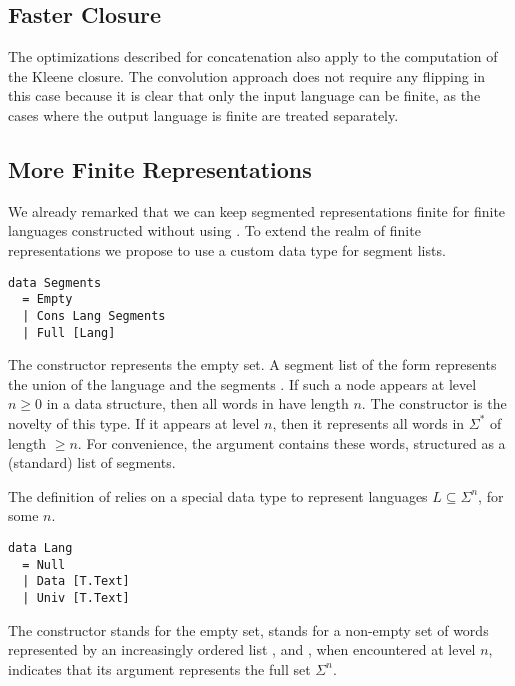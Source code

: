 
\subsection{Faster Closure}
\label{sec:faster-closure}

The optimizations described for concatenation also apply to the
computation of the Kleene closure. The convolution approach does not
require any flipping in this case because it is clear that only the input language
can be finite, as the cases where the output language is finite are
treated separately.  

\subsection{More Finite Representations}
\label{sec:more-finite-repr}

We already remarked that we can keep segmented representations finite
for finite languages constructed without using .  To
extend the realm of finite representations we propose to use a custom
data type  for segment lists.
\begin{lstlisting}
data Segments
  = Empty
  | Cons Lang Segments
  | Full [Lang]
\end{lstlisting}
The constructor  represents the empty set. A segment list
of the form  represents the union of the language
 and the segments . If such a  node
appears at level $n\ge0$ in a  data structure, then all
words in  have length $n$. The constructor  is
the novelty of this type. If it appears at level $n$, then it
represents all words in $\Sigma^*$ of length $\ge n$. For convenience,
the argument  contains these words, structured as a
(standard) list of segments.

The definition of  relies on a special data type  to
represent languages $L\subseteq \Sigma^n$,  for some $n$.
\begin{lstlisting}
data Lang
  = Null
  | Data [T.Text]
  | Univ [T.Text]
\end{lstlisting}
The constructor  stands for the empty set, 
stands for a non-empty set of words represented by an increasingly
ordered list , and , when encountered at level
$n$, indicates that its argument  represents the full set $\Sigma^n$.

